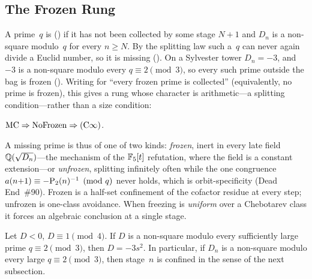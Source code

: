 \subsection{The Frozen Rung}
\label{sec:frozen}

A prime~$q$ is 
() if it has not been
collected by some stage $N{+}1$ and $D_n$ is a non-square modulo~$q$ for
every $n \geq N$.  By the splitting law such a~$q$ can never again divide a
Euclid number, so it is missing
().  On a Sylvester
tower $D_n = -3$, and $-3$ is a non-square modulo every $q \equiv 2
\pmod 3$, so every such prime outside the bag is frozen
().  Writing
 for ``every frozen prime is collected'' (equivalently,
no prime is frozen), this gives a rung whose character is arithmetic---a
splitting condition---rather than a size condition:

\begin{theorem}
\label{thm:frozen-rung}
$\mathrm{MC} \Rightarrow \mathrm{NoFrozen} \Rightarrow (\mathrm{C}\infty)$.
\end{theorem}

A missing prime is thus of one of two kinds: \emph{frozen}, inert in every
late field $\mathbb{Q}(\sqrt{D_n})$---the mechanism of the $\mathbb{F}_5[t]$
refutation, where the field is a constant extension---or
\emph{unfrozen}, splitting infinitely often while the one congruence
$a(n{+}1) \equiv -\mathrm{P}_{2}(n)^{-1} \pmod q$ never holds, which is
orbit-specificity (Dead End~\#90).  Frozen is a half-set confinement of the
cofactor residue at every step; unfrozen is one-class avoidance.  When
freezing is \emph{uniform} over a Chebotarev class it forces an algebraic
conclusion at a single stage.

\begin{theorem}
\label{thm:theorem-A}
Let $D < 0$, $D \equiv 1 \pmod 4$.  If $D$ is a non-square modulo every
sufficiently large prime $q \equiv 2 \pmod 3$, then $D = -3s^2$.  In
particular, if $D_n$ is a non-square modulo every large $q \equiv 2 \pmod
3$, then stage~$n$ is confined in the sense of the next subsection.
\end{theorem}

